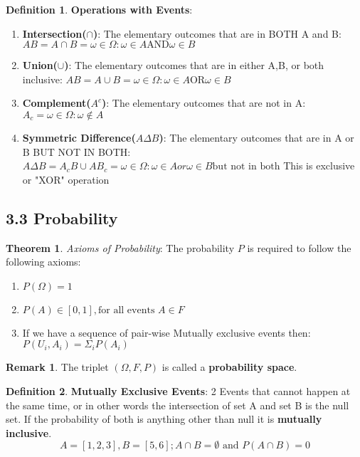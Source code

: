 \documentclass[12pt]{amsart}
\theoremstyle{definition}
\newtheorem{theorem}{Theorem}  %
\newtheorem{definition}{Definition} %
\newtheorem*{remark}{Remark}        %
\numberwithin{equation}{theorem}    %
\begin{document}
\begin{definition}
    \textbf{Operations with Events}:
    \begin{enumerate}
        \item \textbf{Intersection($\cap$)}:
            The elementary outcomes that are in BOTH A and B: $AB = A \cap B={\omega \in \Omega  :\omega \in A \text{AND} \omega \in B}$
        \item \textbf{Union($\cup$)}:
            The elementary outcomes that are in either A,B, or both inclusive: $AB = A \cup B={\omega \in \Omega  :\omega \in A \text{OR} \omega \in B}$
        \item \textbf{Complement($A^c$)}:
            The elementary outcomes that are not in A: $A_c = {\omega \in \Omega : \omega \notin A}$
        \item \textbf{Symmetric Difference($A\Delta B$)}:
            The elementary outcomes that are in A or B BUT NOT IN BOTH: $A\Delta B = A_c B \cup AB_c = {\omega \in \Omega : \omega \in A or \omega \in B \text{but not in both}}$ This is exclusive or "XOR" operation
    \end{enumerate} 
\end{definition}

\subsection*{3.3 Probability}

\begin{theorem}
    \textit{Axioms of Probability}:
    The probability $P$ is required to follow the following axioms:
    \begin{enumerate}
        \item $P(\Omega) = 1$
        \item $P(A) \in [0,1],\text{for all events } A \in F$
        \item If we have a sequence of pair-wise Mutually exclusive events then: $P(U_i,A_i) = \Sigma_i P(A_i)$
    \end{enumerate}
    \begin{remark}
        The triplet $(\Omega,F,P)$ is called a \textbf{probability space}.
    \end{remark}
\end{theorem}

\begin{definition}
    \textbf{Mutually Exclusive Events}:
    2 Events that cannot happen at the same time, or in other words the intersection of set A and set B is the null set. If the probability of both is anything other than null it is \textbf{mutually inclusive}.
    $$A = [1,2,3], B = [5,6] ; A \cap B = \emptyset \text{ and } P(A \cap B) = 0$$

\end{definition}
\end{document}
